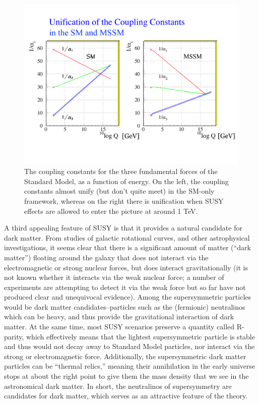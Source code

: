 \begin{figure}
    \center
	\includegraphics[width=\textwidth]{Theory/figures/kazakov_coupling.pdf}
    \caption{The coupling constants for the three fundamental forces of the Standard Model, as a 
    function of energy.  On the left, the coupling constants almost unify 
    (but don't quite meet) in the SM-only framework, 
    whereas on the right there is unification when SUSY effects are allowed to 
    enter the picture at around 1 TeV\cite{Kazakov}. }
	\label{fig:couplings}
\end{figure}


A third appealing feature of SUSY is that it provides a natural candidate for dark 
matter.  From studies of galactic rotational curves, and other astrophysical investigations, it 
seems clear that there is a significant amount of matter (``dark matter'') floating 
around the galaxy that does not interact via the electromagnetic or strong nuclear forces, 
but does interact gravitationally (it is not known whether it interacts via the weak 
nuclear force; a number of experiments are attempting to detect it via the weak 
force but so far have not produced clear and unequivocal evidence).  Among the supersymmetric 
particles would be dark matter candidates--particles such as the (fermionic) neutralinos 
which can be heavy, and thus provide the gravitational interaction of dark matter.  
At the same time, most SUSY scenarios preserve a quantity called R-parity, 
which effectively means that the lightest supersymmetric particle is stable and thus 
would not decay away to Standard Model particles, nor interact via the strong or 
electromagnetic force.  Additionally, the supersymmetric dark matter particles can be ``thermal
relics,'' meaning their annihilation in the early universe stops at about the right
point to give them the mass density that we see in the astronomical dark matter.
In short, the neutralinos of supersymmetry are candidates for dark matter, 
which serves as an attractive feature of the theory. 



